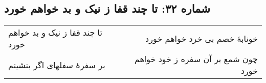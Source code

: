 \begin{center}
\section*{شماره ۳۲: تا چند قفا ز نیک و بد خواهم خورد}
\label{sec:032}
\begin{longtable}{l p{0.5cm} r}
تا چند قفا ز نیک و بد خواهم خورد
&&
خونابهٔ خصم بی خرد خواهم خورد
\\
بر سفرهٔ سفلهای اگر بنشینم
&&
چون شمع بر آن سفره ز خود خواهم خورد
\\
\end{longtable}
\end{center}
